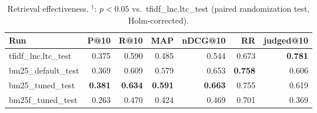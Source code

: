 \begin{table}[t]
\centering
\begin{tabular}{lrrrrrr}
\toprule
Run & P@10 & R@10 & MAP & nDCG@10 & RR & judged@10 \\
\midrule
tfidf\_lnc.ltc\_test & 0.375 & 0.590 & 0.485 & 0.544 & 0.673 & \textbf{0.781} \\
bm25\_default\_test & 0.369 & 0.609 & 0.579 & 0.653 & \textbf{0.758} & 0.606 \\
bm25\_tuned\_test & \textbf{0.381} & \textbf{0.634} & \textbf{0.591} & \textbf{0.663} & 0.755 & 0.619 \\
bm25f\_tuned\_test & 0.263 & 0.470 & 0.424 & 0.469 & 0.701 & 0.369 \\
\bottomrule
\end{tabular}
\caption{Retrieval effectiveness. $^\dagger$: $p<0.05$ vs.\ tfidf\_lnc.ltc\_test (paired randomization test, Holm-corrected).}
\end{table}
